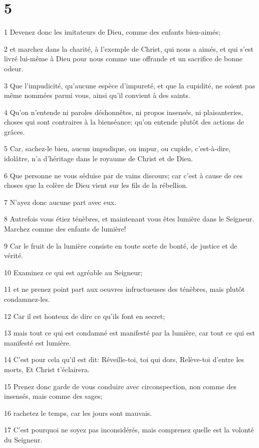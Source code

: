 \chapter{5}

\par 1 Devenez donc les imitateurs de Dieu, comme des enfants bien-aimés;
\par 2 et marchez dans la charité, à l'exemple de Christ, qui nous a aimés, et qui s'est livré lui-même à Dieu pour nous comme une offrande et un sacrifice de bonne odeur.
\par 3 Que l'impudicité, qu'aucune espèce d'impureté, et que la cupidité, ne soient pas même nommées parmi vous, ainsi qu'il convient à des saints.
\par 4 Qu'on n'entende ni paroles déshonnêtes, ni propos insensés, ni plaisanteries, choses qui sont contraires à la bienséance; qu'on entende plutôt des actions de grâces.
\par 5 Car, sachez-le bien, aucun impudique, ou impur, ou cupide, c'est-à-dire, idolâtre, n'a d'héritage dans le royaume de Christ et de Dieu.
\par 6 Que personne ne vous séduise par de vains discours; car c'est à cause de ces choses que la colère de Dieu vient sur les fils de la rébellion.
\par 7 N'ayez donc aucune part avec eux.
\par 8 Autrefois vous étiez ténèbres, et maintenant vous êtes lumière dans le Seigneur. Marchez comme des enfants de lumière!
\par 9 Car le fruit de la lumière consiste en toute sorte de bonté, de justice et de vérité.
\par 10 Examinez ce qui est agréable au Seigneur;
\par 11 et ne prenez point part aux oeuvres infructueuses des ténèbres, mais plutôt condamnez-les.
\par 12 Car il est honteux de dire ce qu'ils font en secret;
\par 13 mais tout ce qui est condamné est manifesté par la lumière, car tout ce qui est manifesté est lumière.
\par 14 C'est pour cela qu'il est dit: Réveille-toi, toi qui dors, Relève-toi d'entre les morts, Et Christ t'éclairera.
\par 15 Prenez donc garde de vous conduire avec circonspection, non comme des insensés, mais comme des sages;
\par 16 rachetez le temps, car les jours sont mauvais.
\par 17 C'est pourquoi ne soyez pas inconsidérés, mais comprenez quelle est la volonté du Seigneur.
